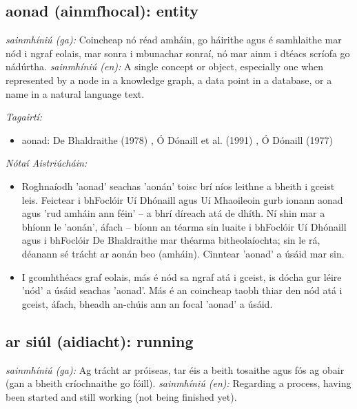 \documentclass{article}
\begin{document}
\subsection*{aonad (ainmfhocal): entity} 
 \noindent \textit{sainmhíniú (ga):} Coincheap nó réad amháin, go háirithe agus é samhlaithe mar nód i ngraf eolais, mar sonra i mbunachar sonraí, nó mar ainm i dtéacs scríofa go nádúrtha.
\newline\newline
 \noindent \textit{sainmhíniú (en):} A single concept or object, especially one when represented by a node in a knowledge graph, a data point in a database, or a name in a natural language text.
\newline

 \noindent \textit{Tagairtí:}
\begin{itemize}
	\item aonad: De Bhaldraithe (1978) \cite{de-bhaldraithe}, Ó Dónaill et al. (1991) \cite{focloir-beag}, Ó Dónaill (1977) \cite{odonaill}
\end{itemize}

 \noindent \textit{Nótaí Aistriúcháin:}
\begin{itemize}
	\item Roghnaíodh 'aonad' seachas 'aonán' toisc brí níos leithne a bheith i gceist leis. Feictear i bhFoclóir Uí Dhónaill agus Uí Mhaoileoin gurb ionann aonad agus 'rud amháin ann féin' -- a bhrí díreach atá de dhíth. Ní shin mar a bhíonn le 'aonán', áfach -- bíonn an téarma sin luaite i bhFoclóir Uí Dhónaill agus i bhFoclóir De Bhaldraithe mar théarma bitheolaíochta; sin le rá, déanann sé trácht ar aonán beo (amháin). Cinntear 'aonad' a úsáid mar sin.
	\item I gcomhthéacs graf eolais, más é nód sa ngraf atá i gceist, is dócha gur léire 'nód' a úsáid seachas 'aonad'. Más é an coincheap taobh thiar den nód atá i gceist, áfach, bheadh an-chúis ann an focal 'aonad' a úsáid.
\end{itemize}


\subsection*{ar siúl (aidiacht): running} 
 \noindent \textit{sainmhíniú (ga):} Ag trácht ar próiseas, tar éis a beith tosaithe agus fós ag obair (gan a bheith críochnaithe go fóill).
\newline\newline
 \noindent \textit{sainmhíniú (en):} Regarding a process, having been started and still working (not being finished yet).
\newline
\end{document}

